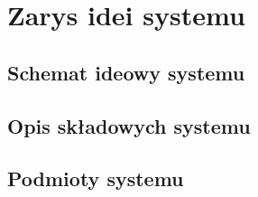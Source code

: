 % 
\newpage\section{Zarys idei systemu \textsl{\NazwaSys}}\label{sec:ideasystemu}
\subsection{Schemat ideowy systemu \textsl{\NazwaSys}}
\subsection{Opis składowych systemu}
\subsection{Podmioty systemu} 
